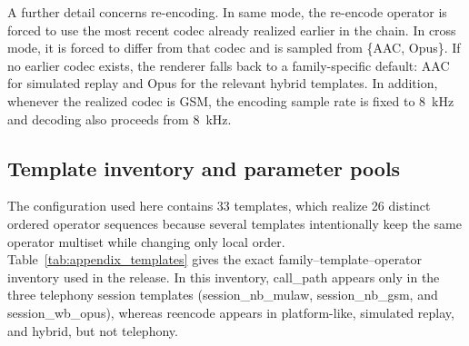 A further detail concerns re-encoding. In same mode, the re-encode operator is forced to use the most recent codec already realized earlier in the chain. In cross mode, it is forced to differ from that codec and is sampled from \{AAC, Opus\}. If no earlier codec exists, the renderer falls back to a family-specific default: AAC for simulated replay and Opus for the relevant hybrid templates. In addition, whenever the realized codec is GSM, the encoding sample rate is fixed to 8~kHz and decoding also proceeds from 8~kHz.

\subsection{Template inventory and parameter pools}

The configuration used here contains 33 templates, which realize 26 distinct ordered operator sequences because several templates intentionally keep the same operator multiset while changing only local order. Table~\ref{tab:appendix_templates} gives the exact family--template--operator inventory used in the release. In this inventory, call\_path appears only in the three telephony session templates (session\_nb\_mulaw, session\_nb\_gsm, and session\_wb\_opus), whereas reencode appears in platform-like, simulated replay, and hybrid, but not telephony.

